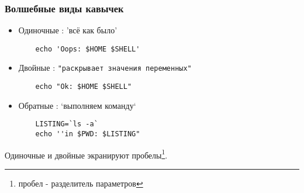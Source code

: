 \begin{frame}[fragile]
  \frametitle{Волшебные виды кавычек}

  \begin{itemize}
    \item \alert{Одиночные} : 'всё как было'
\begin{lstlisting}
	echo 'Oops: $HOME $SHELL'
\end{lstlisting} \pause
    \item \alert{Двойные} :  \verb+"раскрывает значения переменных"+
\begin{lstlisting}
	echo "Ok: $HOME $SHELL"
\end{lstlisting} \pause
    \item \alert{Обратные} : `выполняем команду`
\begin{lstlisting}
	LISTING=`ls -a`
	echo ''in $PWD: $LISTING"
\end{lstlisting}
  \end{itemize}
  Одиночные и двойные экранируют пробелы\footnote{пробел - разделитель параметров}.
\end{frame}
